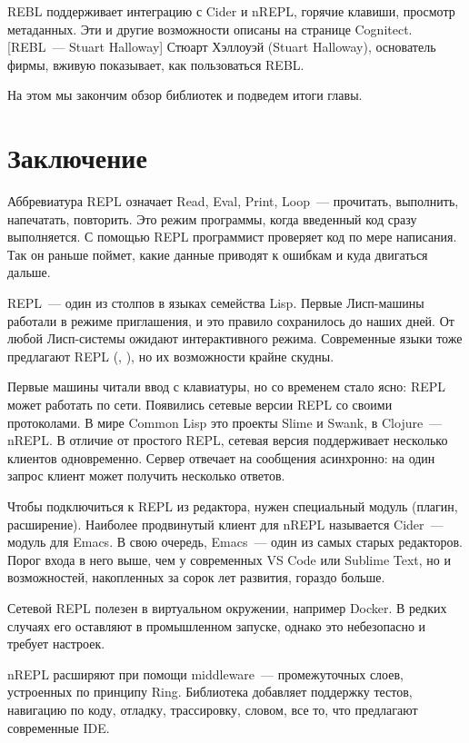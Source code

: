 REBL поддерживает интеграцию с Cider и nREPL, горячие клавиши, просмотр метаданных. Эти и другие возможности описаны на странице Cognitect. [REBL~--- Stuart Halloway] Стюарт Хэллоуэй (Stuart Halloway), основатель фирмы, вживую показывает, как пользоваться REBL.

На этом мы закончим обзор библиотек и подведем итоги главы.

\section{Заключение}


Аббревиатура REPL означает Read, Eval, Print, Loop~--- прочитать, выполнить, напечатать, повторить. Это режим программы, когда введенный код сразу выполняется. С помощью REPL программист проверяет код по мере написания. Так он раньше поймет, какие данные приводят к ошибкам и куда двигаться дальше.

REPL~--- один из столпов в языках семейства Lisp. Первые Лисп-машины работали в режиме приглашения, и это правило сохранилось до наших дней. От любой Лисп-системы ожидают интерактивного режима. Современные языки тоже предлагают REPL (, ), но их возможности крайне скудны.

Первые машины читали ввод с клавиатуры, но со временем стало ясно: REPL может работать по сети. Появились сетевые версии REPL со своими протоколами. В мире Common Lisp это проекты Slime и Swank, в Clojure~--- nREPL. В отличие от простого REPL, сетевая версия поддерживает несколько клиентов одновременно. Сервер отвечает на сообщения асинхронно: на один запрос клиент может получить несколько ответов.

Чтобы подключиться к REPL из редактора, нужен специальный модуль (плагин, расширение). Наиболее продвинутый клиент для nREPL называется Cider~--- модуль для Emacs. В свою очередь, Emacs~--- один из самых старых редакторов. Порог входа в него выше, чем у современных VS Code или Sublime Text, но и возможностей, накопленных за сорок лет развития, гораздо больше.

Сетевой REPL полезен в виртуальном окружении, например Docker. В редких случаях его оставляют в промышленном запуске, однако это небезопасно и требует настроек.

nREPL расширяют при помощи middleware~--- промежуточных слоев, устроенных по принципу Ring. Библиотека  добавляет поддержку тестов, навигацию по коду, отладку, трассировку, словом, все то, что предлагают современные IDE.

